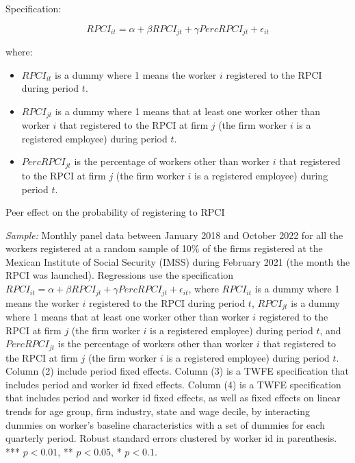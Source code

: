\documentclass[oneside,11pt]{article}
\begin{document}
Specification:

$$RPCI_{it} = \alpha + \beta RPCI_{jt} + \gamma Perc RPCI_{jt} + \epsilon_{it}$$

where:

\begin{itemize}
    \item $RPCI_{it}$ is a dummy where 1 means the worker $i$ registered to the RPCI during period $t$.
    \item $RPCI_{jt}$ is a dummy where 1 means that at least one worker other than worker $i$ that registered to the RPCI at firm $j$ (the firm worker $i$ is a registered employee) during period $t$.
    \item $PercRPCI_{jt}$ is the percentage of workers other than worker $i$ that registered to the RPCI at firm $j$ (the firm worker $i$ is a registered employee) during period $t$.
\end{itemize}

\begin{table}[H]
    \caption{Peer effect on the probability of registering to RPCI}
    \label{peer_rpci_rfc_rpci_dum}
    \begin{center}
    \scriptsize{}
    \end{center}
\end{table}

\scriptsize{
\noindent \textit{Sample:} Monthly panel data between January 2018 and October 2022 for all the workers registered at a random sample of 10\% of the firms registered at the Mexican Institute of Social Security (IMSS) during February 2021 (the month the RPCI was launched). Regressions use the specification $RPCI_{it} = \alpha + \beta RPCI_{jt} + \gamma Perc RPCI_{jt} + \epsilon_{it}$, where $RPCI_{it}$ is a dummy where 1 means the worker $i$ registered to the RPCI during period $t$, $RPCI_{jt}$ is a dummy where 1 means that at least one worker other than worker $i$ registered to the RPCI at firm $j$ (the firm worker $i$ is a registered employee) during period $t$, and $PercRPCI_{jt}$ is the percentage of workers other than worker $i$ that registered to the RPCI at firm $j$ (the firm worker $i$ is a registered employee) during period $t$. Column (2) include period fixed effects. Column (3) is a TWFE specification that includes period and worker id fixed effects. Column (4) is a TWFE specification that includes period and worker id fixed effects, as well as fixed effects on linear trends for age group, firm industry, state and wage decile, by interacting dummies on worker's baseline characteristics with a set of dummies for each quarterly period. Robust standard errors clustered by worker id in parenthesis. *** $p<0.01$, ** $p<0.05$, * $p<0.1$.}
\end{document}
